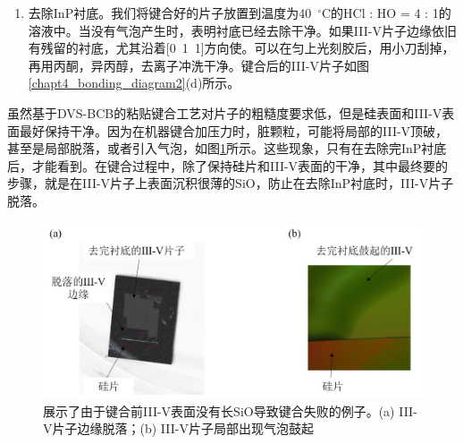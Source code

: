 \begin{enumerate}[(1)]
	\item 去除InP衬底。我们将键合好的片子放置到温度为40~$^{\circ}$C的HCl : HO = 4 : 1的溶液中。当没有气泡产生时，表明衬底已经去除干净。如果III-V片子边缘依旧有残留的衬底，尤其沿着[0~1~1]方向使。可以在匀上光刻胶后，用小刀刮掉，再用丙酮，异丙醇，去离子冲洗干净。键合后的III-V片子如图\ref{chapt4_bonding_diagram2}(d)所示。
\end{enumerate}	

虽然基于DVS-BCB的粘贴键合工艺对片子的粗糙度要求低，但是硅表面和III-V表面最好保持干净。因为在机器键合加压力时，脏颗粒，可能将局部的III-V顶破，甚至是局部脱落，或者引入气泡，如图\ref{chapt4_bonding_error}所示。这些现象，只有在去除完InP衬底后，才能看到。在键合过程中，除了保持硅片和III-V表面的干净，其中最终要的步骤，就是在III-V片子上表面沉积很薄的SiO，防止在去除InP衬底时，III-V片子脱落。
\begin{figure}[htb]
	\centering
	\includegraphics[width=14cm]{./Pictures/chapt4_bonding_error.jpg}
	\caption{展示了由于键合前III-V表面没有长SiO导致键合失败的例子。(a) III-V片子边缘脱落；(b) III-V片子局部出现气泡鼓起}
	\label{chapt4_bonding_error}
\end{figure}
